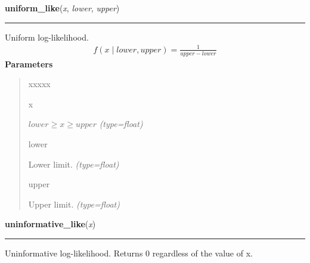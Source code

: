 \hspace{.8\funcindent}\begin{boxedminipage}{\funcwidth}

    \raggedright \textbf{uniform\_like}(\textit{x}, \textit{lower}, \textit{upper})

    \vspace{-1.5ex}

    \rule{\textwidth}{1pt}
\setlength{\parskip}{2ex}

Uniform log-likelihood.
\begin{equation*}\begin{split}f(x \mid lower, upper) = \frac{1}{upper-lower}\end{split}\end{equation*}\setlength{\parskip}{1ex}
      \textbf{Parameters}
      \vspace{-1ex}

      \begin{quote}
        \begin{Ventry}{xxxxx}

          \item[x]


$lower \geq x \geq upper$
            {\it (type=float)}

          \item[lower]


Lower limit.
            {\it (type=float)}

          \item[upper]


Upper limit.
            {\it (type=float)}

        \end{Ventry}

      \end{quote}

    \end{boxedminipage}

    \label{pymc:distributions:uninformative_like}

    \vspace{0.5ex}

\hspace{.8\funcindent}\begin{boxedminipage}{\funcwidth}

    \raggedright \textbf{uninformative\_like}(\textit{x})

    \vspace{-1.5ex}

    \rule{\textwidth}{1pt}
\setlength{\parskip}{2ex}

Uninformative log-likelihood. Returns 0 regardless of the value of x.
\setlength{\parskip}{1ex}
    \end{boxedminipage}

